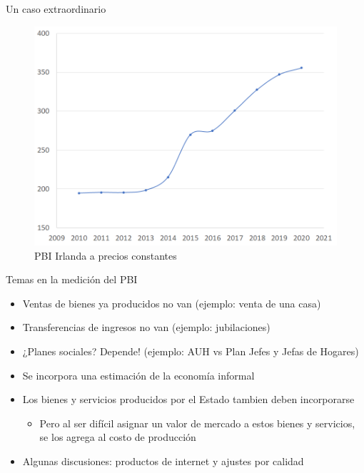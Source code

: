 \documentclass{beamer}
\begin{document}
\begin{frame}{Un caso extraordinario }
    
\begin{figure} [H]
\centering
\includegraphics[]{Figures/G1.png}
\caption{PBI Irlanda a precios constantes}
\label{fig:G1}
\end{figure} 
\end{frame}

\begin{frame}{Temas en la medición del PBI}
    \begin{itemize}
        \item Ventas de bienes ya producidos no van (ejemplo: venta de una casa)
        \item Transferencias de ingresos no van (ejemplo: jubilaciones) 
        \item ¿Planes sociales? Depende! (ejemplo: AUH vs Plan Jefes y Jefas de Hogares)
        \item Se incorpora una estimación de la economía informal
        \item Los bienes y servicios producidos por el Estado tambien deben incorporarse
        \begin{itemize}
            \item Pero al ser difícil asignar un valor de mercado a estos bienes y servicios, se los agrega al costo de producción
        \end{itemize}
        \item Algunas discusiones: productos de internet y ajustes por calidad
    \end{itemize}
\end{frame}
\end{document}
